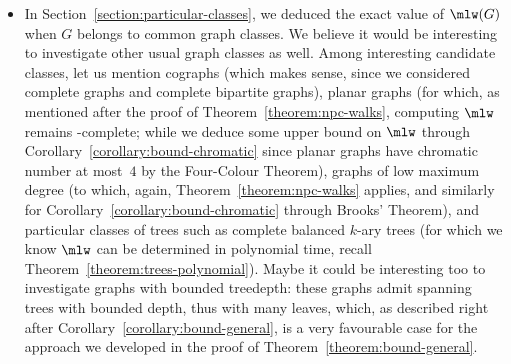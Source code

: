 \documentclass[a4paper,11pt,dvipsnames]{elsarticle}
\begin{document}
\begin{itemize}
    \item In Section~\ref{section:particular-classes}, we deduced the exact value of $\mlw(G)$ when $G$ belongs to common graph classes. We believe it would be interesting to investigate other usual graph classes as well. Among interesting candidate classes, let us mention cographs (which makes sense, since we considered complete graphs and complete bipartite graphs), planar graphs (for which, as mentioned after the proof of Theorem~\ref{theorem:npc-walks}, computing $\mlw$ remains \np-complete; while we deduce some upper bound on $\mlw$ through Corollary~\ref{corollary:bound-chromatic} since planar graphs have chromatic number at most~$4$ by the Four-Colour Theorem), graphs of low maximum degree (to which, again, Theorem~\ref{theorem:npc-walks} applies, and similarly for Corollary~\ref{corollary:bound-chromatic} through Brooks' Theorem), and particular classes of trees such as complete balanced $k$-ary trees (for which we know $\mlw$ can be determined in polynomial time, recall Theorem~\ref{theorem:trees-polynomial}). 
    Maybe it could be interesting too to investigate graphs with bounded treedepth: these graphs admit spanning trees with bounded depth, thus with many leaves, which, as described right after Corollary~\ref{corollary:bound-general}, is a very favourable case for the approach we developed in the proof of Theorem~\ref{theorem:bound-general}.
    

\end{itemize}
\end{document}
